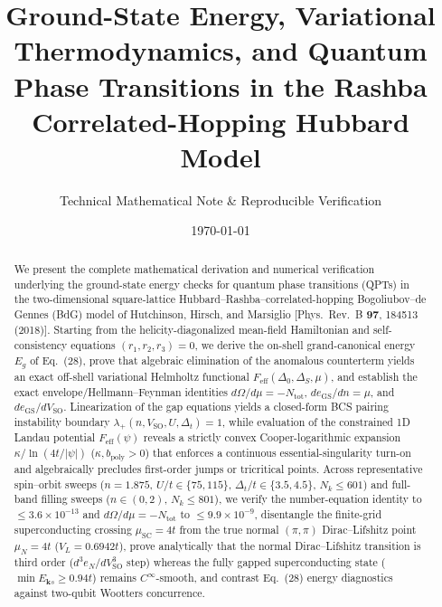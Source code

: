 \documentclass[aps,prb,twocolumn,superscriptaddress,longbibliography,floatfix]{revtex4-2}
\newcommand{\SO}{V_{\mathrm{SO}}}
\newcommand{\ks}{\mathbf{k}s}
\begin{document}
\title{Ground-State Energy, Variational Thermodynamics, and Quantum Phase Transitions in the Rashba Correlated-Hopping Hubbard Model}

\author{Technical Mathematical Note \& Reproducible Verification}

\date{\today}

\begin{abstract}
We present the complete mathematical derivation and numerical verification underlying the ground-state energy checks for quantum phase transitions (QPTs) in the two-dimensional square-lattice Hubbard--Rashba--correlated-hopping Bogoliubov--de Gennes (BdG) model of Hutchinson, Hirsch, and Marsiglio [Phys.\ Rev.\ B \textbf{97}, 184513 (2018)]. Starting from the helicity-diagonalized mean-field Hamiltonian and self-consistency equations $(r_1,r_2,r_3)=0$, we derive the on-shell grand-canonical energy $E_g$ of Eq.~(28), prove that algebraic elimination of the anomalous counterterm yields an exact off-shell variational Helmholtz functional $F_{\mathrm{eff}}(\Delta_0,\Delta_S,\mu)$, and establish the exact envelope/Hellmann--Feynman identities $d\Omega/d\mu = -N_{\mathrm{tot}}$, $de_{\mathrm{GS}}/dn = \mu$, and $de_{\mathrm{GS}}/d\SO$. Linearization of the gap equations yields a closed-form BCS pairing instability boundary $\lambda_+(n,\SO,U,\Delta_t) = 1$, while evaluation of the constrained 1D Landau potential $F_{\mathrm{eff}}(\psi)$ reveals a strictly convex Cooper-logarithmic expansion $\kappa/\ln(4t/|\psi|)$ ($\kappa,b_{\mathrm{poly}}>0$) that enforces a continuous essential-singularity turn-on and algebraically precludes first-order jumps or tricritical points. Across representative spin--orbit sweeps ($n=1.875$, $U/t\in\{75,115\}$, $\Delta_t/t\in\{3.5,4.5\}$, $N_k\le 601$) and full-band filling sweeps ($n\in(0,2)$, $N_k\le 801$), we verify the number-equation identity to $\le 3.6\times 10^{-13}$ and $d\Omega/d\mu=-N_{\mathrm{tot}}$ to $\le 9.9\times 10^{-9}$, disentangle the finite-grid superconducting crossing $\mu_{\mathrm{SC}}=4t$ from the true normal $(\pi,\pi)$ Dirac--Lifshitz point $\mu_N=4t$ ($V_L=0.6942t$), prove analytically that the normal Dirac--Lifshitz transition is third order ($d^3 e_N/d\SO^3$ step) whereas the fully gapped superconducting state ($\min E_{\ks}\ge 0.94t$) remains $C^\infty$-smooth, and contrast Eq.~(28) energy diagnostics against two-qubit Wootters concurrence.
\end{abstract}
\end{document}
